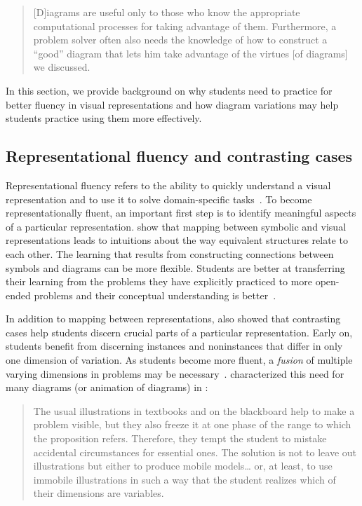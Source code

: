 \begin{quote}
[D]iagrams are useful only to those who know the appropriate computational processes for taking advantage of them. Furthermore, a problem solver often also needs the knowledge of how to construct a ``good'' diagram that lets him take advantage of the virtues [of diagrams] we discussed.~\cite[p.~99]{whyDiagramWorth}
\end{quote}

In this section, we provide background on why students need to practice for better fluency in visual representations and how diagram variations may help students practice using them more effectively. 

\subsection{Representational fluency and contrasting cases}

Representational fluency refers to the ability to quickly understand a visual representation and to use it to solve domain-specific tasks~\cite{multipleReps}. To become representationally fluent, an important first step is to identify meaningful aspects of a particular representation. \citet{kellman_perceptual_2010} show that mapping between symbolic and visual representations leads to intuitions about the way equivalent structures relate to each other. The learning that results from constructing connections between symbols and diagrams can be more flexible. Students are better at transferring their learning from the problems they have explicitly practiced to more open-ended problems and their conceptual understanding is better~\cite{25learning}. 

In addition to mapping between representations, \citet{marton_sameness_2006} also showed that contrasting cases help students discern crucial parts of a particular representation. Early on, students benefit from discerning instances and noninstances that differ in only one dimension of variation. As students become more fluent, a \emph{fusion} of multiple varying dimensions in problems may be necessary~\cite{chik_simultaneity_2004}. \citet{arnheim_visual_1969} characterized this need for many diagrams (or animation of diagrams) in :

\begin{quote}
The usual illustrations in textbooks and on the blackboard help to make a problem visible, but they also freeze it at one phase of the range to which the proposition refers. Therefore, they tempt the student to mistake accidental circumstances for essential ones. The solution is not to leave out illustrations but either to produce mobile models\dots{} or, at least, to use immobile illustrations in such a way that the student realizes which of their dimensions are variables. ~\cite[p. 182]{arnheim_visual_1969}
\end{quote}

